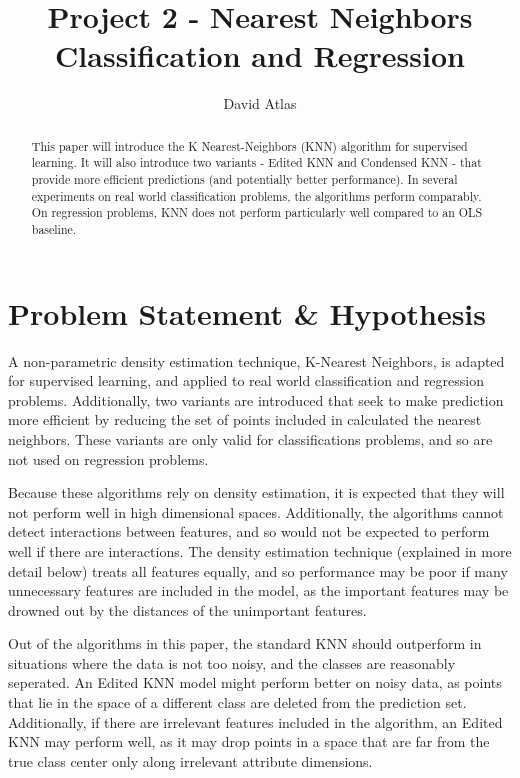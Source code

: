 \documentclass{amsart}
\title{Project 2 - Nearest Neighbors Classification and Regression}
\author{David Atlas}
\begin{document}
    \begin{abstract}
        This paper will introduce the K Nearest-Neighbors (KNN) algorithm for supervised learning.
        It will also introduce two variants - Edited KNN and Condensed KNN - that provide
        more efficient predictions (and potentially better performance). In several experiments on
        real world classification problems, the algorithms perform comparably. On regression
        problems, KNN does not perform particularly well compared to an OLS baseline.
    \end{abstract}
    \maketitle
    \section{Problem Statement \& Hypothesis}
    A non-parametric density estimation technique, K-Nearest Neighbors,
    is adapted for supervised learning, and applied to
    real world classification and regression problems. Additionally,
    two variants are introduced that seek to make prediction more efficient
    by reducing the set of points included in calculated the nearest neighbors. These variants
    are only valid for classifications problems, and so are not used on regression problems.

    Because these algorithms rely on density estimation, it is expected that they will
    not perform well in high dimensional spaces. Additionally, the algorithms cannot detect
    interactions between features, and so would not be expected to perform well if there are
    interactions. The density estimation technique (explained in more detail below) treats
    all features equally, and so performance may be poor if many unnecessary features are
    included in the model, as the important features may be drowned out by the distances
    of the unimportant features.

    Out of the algorithms in this paper, the standard KNN should outperform in situations
    where the data is not too noisy, and the classes are reasonably seperated. An Edited KNN
    model might perform better on noisy data, as points that lie in the space of a different
    class are deleted from the prediction set. Additionally, if there are irrelevant
    features included in the algorithm, an Edited KNN may perform well, as it may drop points in
    a space that are far from the true class center only along irrelevant attribute dimensions.
\end{document}
